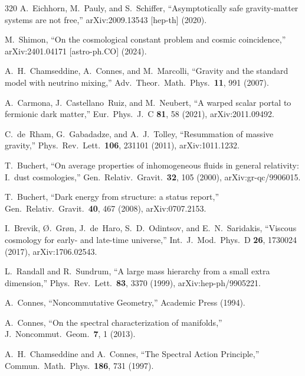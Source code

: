 \begin{thebibliography}{320}
A.~Eichhorn, M.~Pauly, and S.~Schiffer,
``Asymptotically safe gravity-matter systems are not free,''
arXiv:2009.13543 [hep-th] (2020).

M.~Shimon,
``On the cosmological constant problem and cosmic coincidence,''
arXiv:2401.04171 [astro-ph.CO] (2024).

A.~H.~Chamseddine, A.~Connes, and M.~Marcolli,
``Gravity and the standard model with neutrino mixing,''
Adv.\ Theor.\ Math.\ Phys.\ \textbf{11}, 991 (2007).

A.~Carmona, J.~Castellano~Ruiz, and M.~Neubert,
``A warped scalar portal to fermionic dark matter,''
Eur.\ Phys.\ J.\ C \textbf{81}, 58 (2021),
arXiv:2011.09492.


C.~de~Rham, G.~Gabadadze, and A.~J.~Tolley,
``Resummation of massive gravity,''
Phys.\ Rev.\ Lett.\ \textbf{106}, 231101 (2011),
arXiv:1011.1232.

T.~Buchert,
``On average properties of inhomogeneous fluids in general relativity: I.\ dust cosmologies,''
Gen.\ Relativ.\ Gravit.\ \textbf{32}, 105 (2000),
arXiv:gr-qc/9906015.

T.~Buchert,
``Dark energy from structure: a status report,''
Gen.\ Relativ.\ Gravit.\ \textbf{40}, 467 (2008),
arXiv:0707.2153.

I.~Brevik, \O.~Gr\o{}n, J.~de~Haro, S.~D.~Odintsov, and E.~N.~Saridakis,
``Viscous cosmology for early- and late-time universe,''
Int.\ J.\ Mod.\ Phys.\ D \textbf{26}, 1730024 (2017),
arXiv:1706.02543.

L.~Randall and R.~Sundrum,
``A large mass hierarchy from a small extra dimension,''
Phys.\ Rev.\ Lett.\ \textbf{83}, 3370 (1999),
arXiv:hep-ph/9905221.


A.~Connes,
``Noncommutative Geometry,''
Academic Press (1994).

A.~Connes,
``On the spectral characterization of manifolds,''
J.\ Noncommut.\ Geom.\ \textbf{7}, 1 (2013).

A.~H.~Chamseddine and A.~Connes,
``The Spectral Action Principle,''
Commun.\ Math.\ Phys.\ \textbf{186}, 731 (1997).


\end{thebibliography}
